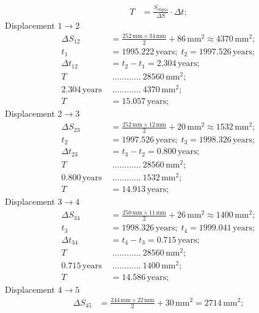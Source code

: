 \begin{description}
\begin{align*}
    T &= \frac{S_{\mathrm{elipsa}}}{\Delta S}\cdot\Delta t;
  \end{align*}
  Displacement $1 \rightarrow 2$
  \begin{align*}
    \Delta S_{12} &= \frac{252\,\mathrm{mm}\times34\,\mathrm{mm}}{2}
      + 86\,\mathrm{mm}^2 \approx 4370\,\mathrm{mm}^2;\\
    t_1 &= 1995.222\,\mathrm{years};\; t_2 = 1997.526\,\mathrm{years};\\
    \Delta t_{12} &= t_2 - t_1 = 2.304\,\mathrm{years};\\
    T\ &\ \dots\dots\dots\dots\ 28560\,\mathrm{mm}^2;\\
    2.304\,\mathrm{years}\ &\ \dots\dots\dots\dots\ 4370\,\mathrm{mm}^2;\\
    T &= 15.057\,\mathrm{years};
  \end{align*}
  Displacement $2 \rightarrow 3$
  \begin{align*}
    \Delta S_{23} &= \frac{252\,\mathrm{mm}\times12\,\mathrm{mm}}{2}
      + 20\,\mathrm{mm}^2 \approx 1532\,\mathrm{mm}^2;\\
    t_2 &= 1997.526\,\mathrm{years};\; t_3 = 1998.326\,\mathrm{years};\\
    \Delta t_{23} &= t_3 - t_2 = 0.800\,\mathrm{years};\\
    T\ &\ \dots\dots\dots\dots\ 28560\,\mathrm{mm}^2;\\
    0.800\,\mathrm{years}\ &\ \dots\dots\dots\dots\ 1532\,\mathrm{mm}^2;\\
    T &= 14.913\,\mathrm{years};
  \end{align*}
  Displacement $3 \rightarrow 4$
  \begin{align*}
    \Delta S_{34} &= \frac{250\,\mathrm{mm}\times11\,\mathrm{mm}}{2}
      + 26\,\mathrm{mm}^2 \approx 1400\,\mathrm{mm}^2;\\
    t_3 &= 1998.326\,\mathrm{years};\; t_4 = 1999.041\,\mathrm{years};\\
    \Delta t_{34} &= t_4 - t_3 = 0.715\,\mathrm{years};\\
    T\ &\ \dots\dots\dots\dots\ 28560\,\mathrm{mm}^2;\\
    0.715\,\mathrm{years}\ &\ \dots\dots\dots\dots\ 1400\,\mathrm{mm}^2;\\
    T &= 14.586\,\mathrm{years};
  \end{align*}
  Displacement $4 \rightarrow 5$
  \begin{align*}
    \Delta S_{45} &= \frac{244\,\mathrm{mm}\times22\,\mathrm{mm}}{2}
      + 30\,\mathrm{mm}^2 = 2714\,\mathrm{mm}^2;\\

\end{align*}
\end{description}
